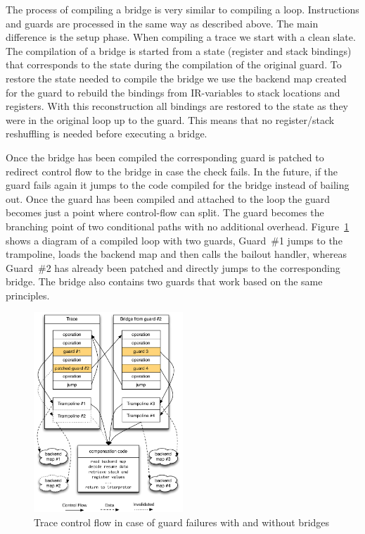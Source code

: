 \documentclass[10pt,preprint]{sigplanconf}
\begin{document}
The process of compiling a bridge is very similar to compiling a loop.
Instructions and guards are processed in the same way as described above. The
main difference is the setup phase. When compiling a trace we start with a clean
slate. The compilation of a bridge is started from a state (register and stack
bindings) that corresponds to the state during the compilation of the original
guard. To restore the state needed to compile the bridge we use the backend map
created for the guard to rebuild the bindings from IR-variables
to stack locations and registers.  With this
reconstruction all bindings are restored to the state as they were in the
original loop up to the guard. This means that no register/stack reshuffling is
needed before executing a bridge.

Once the bridge has been compiled the corresponding guard is
patched to redirect control flow to the bridge in case the check fails. In
the future, if the guard fails again it jumps to the code compiled for the bridge
instead of bailing out. Once the guard has been compiled and attached to the
loop the guard becomes just a point where control-flow can split.
The guard becomes the branching point of two conditional paths with no
additional overhead.
Figure~\ref{fig:trampoline} shows a diagram of a compiled loop with two guards,
Guard~\#1 jumps to the trampoline, loads the backend map and
then calls the bailout handler, whereas Guard~\#2 has already been patched
and directly jumps to the corresponding bridge. The bridge also contains two
guards that work based on the same principles.
\begin{figure}
\centering
\includegraphics[width=0.5\textwidth]{figures/loop_bridge.pdf}
\caption{Trace control flow in case of guard failures with and without bridges}
\label{fig:trampoline}
\end{figure}
\end{document}
